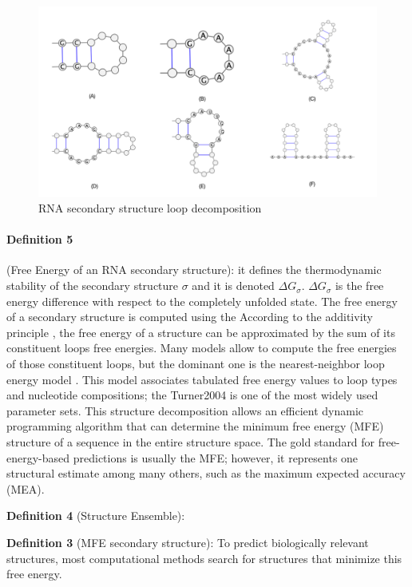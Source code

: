 \begin{figure}[H]
	\includegraphics[width=1.0 \linewidth]{../res/images/arnaque/intro/loops}
	\caption{RNA secondary structure loop decomposition}\label{fig:loops}
\end{figure}

\paragraph{\textbf{Definition 5}} (Free Energy of an RNA secondary structure):  it defines the thermodynamic stability of the secondary structure $\sigma$ and it is denoted \(\Delta G_{\sigma}\). \(\Delta G_{\sigma}\) is the free energy difference with respect to the completely unfolded state. The free energy of a secondary structure is computed using the According to the additivity principle \cite{dill97_addit_princ_bioch}, the free energy of a structure can be approximated by the sum of its constituent loops free energies. Many models allow to compute the free energies of those constituent loops, but the dominant one is the nearest-neighbor loop energy model \cite{turner09_nndb}. This model associates tabulated free energy values to loop types and nucleotide compositions; the Turner2004 \cite{mathews2004incorporating} is one of the most widely used parameter sets. This structure decomposition allows an efficient dynamic programming algorithm that can determine the minimum free energy (MFE) structure of a sequence in the entire structure space. The gold standard for free-energy-based predictions is usually the MFE; however, it represents one structural estimate among many others, such as the maximum expected accuracy (MEA).    

\textbf{Definition 4} (Structure Ensemble):

\textbf{Definition 3} (MFE secondary structure): To predict biologically relevant structures, most computational methods search for structures that minimize this free energy.

